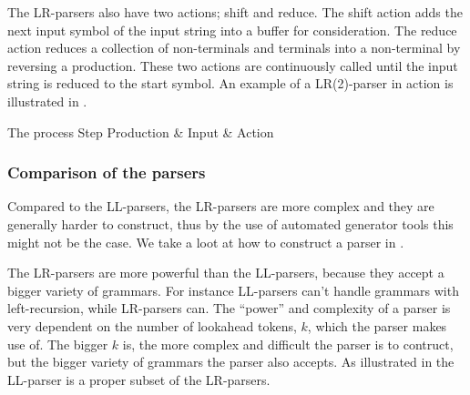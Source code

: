 The LR-parsers
also have two actions; shift and reduce. The shift action adds the next input
symbol of the input string into a buffer for consideration. The reduce action
reduces a collection of non-terminals and terminals into a non-terminal by
reversing a production. These two actions are continuously called until the
input string is reduced to the start symbol.
\cite{LL(1)andLR(2)inaction} 
An example of a LR(2)-parser in action is illustrated in .

	  {The process	    					 }
{Step  	 }{Production & Input       & Action                     }{
}

\subsubsection{Comparison of the parsers}
Compared to the LL-parsers, the LR-parsers are more complex and they are
generally harder to construct,\cite[pp. 193]{sebesta2013} thus by the use of
automated generator tools this might not be the case. We take a loot at how to 
construct a parser in . 

The LR-parsers are more powerful than the LL-parsers, because they accept a
bigger variety of grammars. For instance LL-parsers can't handle grammars with
left-recursion, while LR-parsers can. The ``power'' and complexity of a parser
is very dependent on the number of lookahead tokens, $k$, which the parser makes
use of. The bigger $k$ is, the more complex and difficult the parser is to
contruct, but the bigger variety of grammars the parser also accepts. As
illustrated in  the LL-parser is a proper
subset of the LR-parsers.

